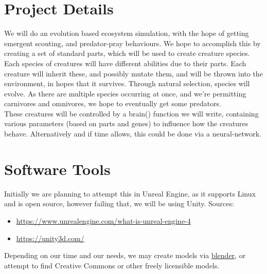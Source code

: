 \documentclass[runningheads]{llncs}
\begin{document}
\section{Project Details}
We will do an evolution based ecosystem simulation, with the hope of getting emergent scouting, and predator-pray behaviours. We hope to accomplish this by creating a set of standard parts, which will be used to create creature species. Each species of creatures will have different abilities due to their parts. Each creature will inherit these, and possibly mutate them, and will be thrown into the environment, in hopes that it survives. Through natural selection, species will evolve. As there are multiple species occurring at once, and we're permitting carnivores and omnivores, we hope to eventually get some predators.\\
These creatures will be controlled by a brain() function we will write, containing various parameters (based on parts and genes) to influence how the creatures behave. Alternatively and if time allows, this could be done via a neural-network.
%
\section{Software Tools}
Initially we are planning to attempt this in Unreal Engine, as it supports Linux and is open source, however failing that, we will be using Unity.
Sources:
\begin{itemize}
\item \url{https://www.unrealengine.com/what-is-unreal-engine-4}
\item \url{https://unity3d.com/}
\end{itemize}
Depending on our time and our needs, we may create models via \href{https://www.blender.org/}{blender}, or attempt to find Creative Commons or other freely licensible models.
%
\end{document}
